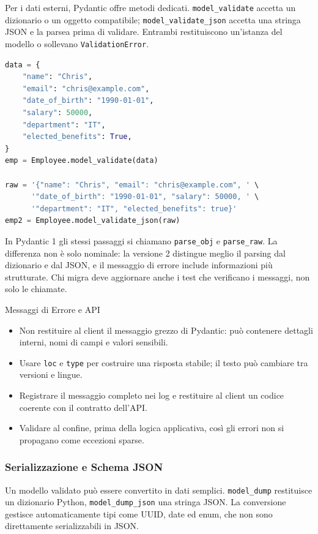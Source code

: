 \documentclass[12pt]{extarticle}
\begin{document}
\noindent Per i dati esterni, Pydantic offre metodi dedicati. \texttt{model\_validate} accetta un dizionario o un oggetto compatibile; \texttt{model\_validate\_json} accetta una stringa JSON e la parsea prima di validare. Entrambi restituiscono un'istanza del modello o sollevano \texttt{ValidationError}.

\begin{lstlisting}[language=Python]
data = {
    "name": "Chris",
    "email": "chris@example.com",
    "date_of_birth": "1990-01-01",
    "salary": 50000,
    "department": "IT",
    "elected_benefits": True,
}
emp = Employee.model_validate(data)

raw = '{"name": "Chris", "email": "chris@example.com", ' \
      '"date_of_birth": "1990-01-01", "salary": 50000, ' \
      '"department": "IT", "elected_benefits": true}'
emp2 = Employee.model_validate_json(raw)
\end{lstlisting}

\noindent In Pydantic 1 gli stessi passaggi si chiamano \texttt{parse\_obj} e \texttt{parse\_raw}. La differenza non è solo nominale: la versione 2 distingue meglio il parsing dal dizionario e dal JSON, e il messaggio di errore include informazioni più strutturate. Chi migra deve aggiornare anche i test che verificano i messaggi, non solo le chiamate.

\begin{cbox}{Messaggi di Errore e API}
\begin{itemize}
    \item Non restituire al client il messaggio grezzo di Pydantic: può contenere dettagli interni, nomi di campi e valori sensibili.
    \item Usare \texttt{loc} e \texttt{type} per costruire una risposta stabile; il testo può cambiare tra versioni e lingue.
    \item Registrare il messaggio completo nei log e restituire al client un codice coerente con il contratto dell'API.
    \item Validare al confine, prima della logica applicativa, così gli errori non si propagano come eccezioni sparse.
\end{itemize}
\end{cbox}

\subsubsection{Serializzazione e Schema JSON}

\noindent Un modello validato può essere convertito in dati semplici. \texttt{model\_dump} restituisce un dizionario Python, \texttt{model\_dump\_json} una stringa JSON. La conversione gestisce automaticamente tipi come UUID, date ed enum, che non sono direttamente serializzabili in JSON.
\end{document}
